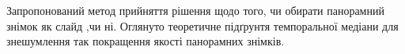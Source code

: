 \chapterConclusion

Запропонований метод прийняття рішення щодо того, чи обирати панорамний знімок як слайд ,чи ні.
Оглянуто теоретичне підґрунтя темпоральної медіани для 
знешумлення так покращення якості панорамних знімків.